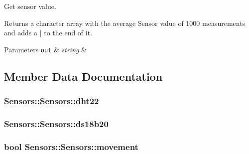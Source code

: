 Get sensor value. 

Returns a character array with the average Sensor value of 1000 measurements and adds a $\vert$ to the end of it. 
\begin{DoxyParams}[1]{Parameters}
\mbox{\tt out}  & {\em string} & \\
\hline
\end{DoxyParams}


\subsection{Member Data Documentation}
\subsubsection[{\texorpdfstring{dht22}{dht22}}]{ Sensors\+::\+Sensors\+::dht22\hspace{0.3cm}{\ttfamily [private]}}\hypertarget{classSensors_1_1Sensors_a314fc192a99b64c4679670dcc815eee6}{}\label{classSensors_1_1Sensors_a314fc192a99b64c4679670dcc815eee6}
\subsubsection[{\texorpdfstring{ds18b20}{ds18b20}}]{ Sensors\+::\+Sensors\+::ds18b20\hspace{0.3cm}{\ttfamily [private]}}\hypertarget{classSensors_1_1Sensors_a5636b26f9866b438dd8a5b939f415146}{}\label{classSensors_1_1Sensors_a5636b26f9866b438dd8a5b939f415146}
\subsubsection[{\texorpdfstring{movement}{movement}}]{\setlength{\rightskip}{0pt plus 5cm}bool Sensors\+::\+Sensors\+::movement\hspace{0.3cm}{\ttfamily [private]}}\hypertarget{classSensors_1_1Sensors_a04531cb6b01facf58e40cc4263e0904f}{}\label{classSensors_1_1Sensors_a04531cb6b01facf58e40cc4263e0904f}
